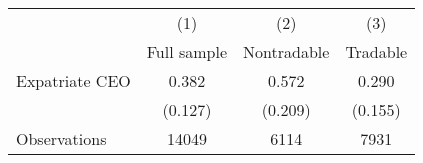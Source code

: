 \begin{tabular}{l*{3}{c}}
\hline\hline
                    &\multicolumn{1}{c}{(1)}&\multicolumn{1}{c}{(2)}&\multicolumn{1}{c}{(3)}\\
                    &\multicolumn{1}{c}{Full sample}&\multicolumn{1}{c}{Nontradable}&\multicolumn{1}{c}{Tradable}\\
\hline
Expatriate CEO      &       0.382&       0.572&       0.290\\
                    &     (0.127)&     (0.209)&     (0.155)\\
\hline
Observations        &       14049&        6114&        7931\\
\hline\hline
\end{tabular}
